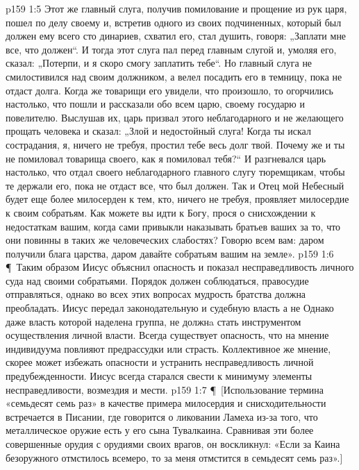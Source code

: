 \vs p159 1:5 Этот же главный слуга, получив помилование и прощение из рук царя, пошел по делу своему и, встретив одного из своих подчиненных, который был должен ему всего сто динариев, схватил его, стал душить, говоря: „Заплати мне все, что должен“. И тогда этот слуга пал перед главным слугой и, умоляя его, сказал: „Потерпи, и я скоро смогу заплатить тебе“. Но главный слуга не смилостивился над своим должником, а велел посадить его в темницу, пока не отдаст долга. Когда же товарищи его увидели, что произошло, то огорчились настолько, что пошли и рассказали обо всем царю, своему государю и повелителю. Выслушав их, царь призвал этого неблагодарного и не желающего прощать человека и сказал: „Злой и недостойный слуга! Когда ты искал сострадания, я, ничего не требуя, простил тебе весь долг твой. Почему же и ты не помиловал товарища своего, как я помиловал тебя?“ И разгневался царь настолько, что отдал своего неблагодарного главного слугу тюремщикам, чтобы те держали его, пока не отдаст все, что был должен. Так и Отец мой Небесный будет еще более милосерден к тем, кто, ничего не требуя, проявляет милосердие к своим собратьям. Как можете вы идти к Богу, прося о снисхождении к недостаткам вашим, когда сами привыкли наказывать братьев ваших за то, что они повинны в таких же человеческих слабостях? Говорю всем вам: даром получили блага царства, даром давайте собратьям вашим на земле».
\vs p159 1:6 \P\ Таким образом Иисус объяснил опасность и показал несправедливость личного суда над своими собратьями. Порядок должен соблюдаться, правосудие отправляться, однако во всех этих вопросах мудрость братства должна преобладать. Иисус передал законодательную и судебную власть  а не  Однако даже власть которой наделена группа, не должнa стать инструментом осуществления личной власти. Всегда существует опасность, что на мнение индивидуума повлияют предрассудки или страсть. Коллективное же мнение, скорее может избежать опасности и устранить несправедливость личной предубежденности. Иисус всегда старался свести к минимуму элементы несправедливости, возмездия и мести.
\vs p159 1:7 \P\ [Использование термина «семьдесят семь раз» в качестве примера милосердия и снисходительности встречается в Писании, где говорится о ликовании Ламеха из\hyp{}за того, что металлическое оружие есть у его сына Тувалкаина. Сравнивая эти более совершенные орудия с орудиями своих врагов, он воскликнул: «Если за Каина безоружного отмстилось всемеро, то за меня отмстится в семьдесят семь раз».]
